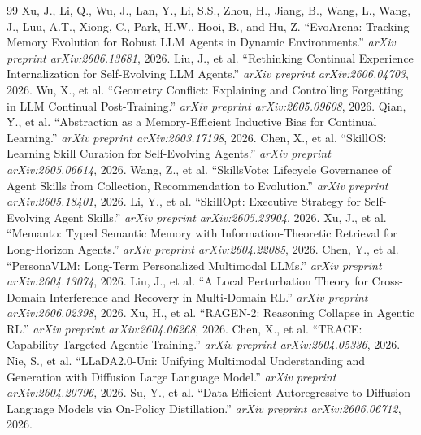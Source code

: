 \documentclass[11pt,a4paper]{article}
\begin{document}
\begin{thebibliography}{99}
 Xu, J., Li, Q., Wu, J., Lan, Y., Li, S.S., Zhou, H., Jiang, B., Wang, L., Wang, J., Luu, A.T., Xiong, C., Park, H.W., Hooi, B., and Hu, Z. ``EvoArena: Tracking Memory Evolution for Robust LLM Agents in Dynamic Environments.'' \emph{arXiv preprint arXiv:2606.13681}, 2026.
 Liu, J., et al. ``Rethinking Continual Experience Internalization for Self-Evolving LLM Agents.'' \emph{arXiv preprint arXiv:2606.04703}, 2026.
 Wu, X., et al. ``Geometry Conflict: Explaining and Controlling Forgetting in LLM Continual Post-Training.'' \emph{arXiv preprint arXiv:2605.09608}, 2026.
 Qian, Y., et al. ``Abstraction as a Memory-Efficient Inductive Bias for Continual Learning.'' \emph{arXiv preprint arXiv:2603.17198}, 2026.
 Chen, X., et al. ``SkillOS: Learning Skill Curation for Self-Evolving Agents.'' \emph{arXiv preprint arXiv:2605.06614}, 2026.
 Wang, Z., et al. ``SkillsVote: Lifecycle Governance of Agent Skills from Collection, Recommendation to Evolution.'' \emph{arXiv preprint arXiv:2605.18401}, 2026.
 Li, Y., et al. ``SkillOpt: Executive Strategy for Self-Evolving Agent Skills.'' \emph{arXiv preprint arXiv:2605.23904}, 2026.
 Xu, J., et al. ``Memanto: Typed Semantic Memory with Information-Theoretic Retrieval for Long-Horizon Agents.'' \emph{arXiv preprint arXiv:2604.22085}, 2026.
 Chen, Y., et al. ``PersonaVLM: Long-Term Personalized Multimodal LLMs.'' \emph{arXiv preprint arXiv:2604.13074}, 2026.
 Liu, J., et al. ``A Local Perturbation Theory for Cross-Domain Interference and Recovery in Multi-Domain RL.'' \emph{arXiv preprint arXiv:2606.02398}, 2026.
 Xu, H., et al. ``RAGEN-2: Reasoning Collapse in Agentic RL.'' \emph{arXiv preprint arXiv:2604.06268}, 2026.
 Chen, X., et al. ``TRACE: Capability-Targeted Agentic Training.'' \emph{arXiv preprint arXiv:2604.05336}, 2026.
 Nie, S., et al. ``LLaDA2.0-Uni: Unifying Multimodal Understanding and Generation with Diffusion Large Language Model.'' \emph{arXiv preprint arXiv:2604.20796}, 2026.
 Su, Y., et al. ``Data-Efficient Autoregressive-to-Diffusion Language Models via On-Policy Distillation.'' \emph{arXiv preprint arXiv:2606.06712}, 2026.
\end{thebibliography}
\end{document}
